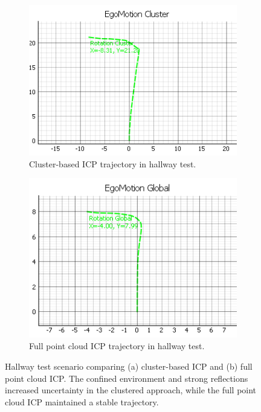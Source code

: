 \begin{figure}[!htbp]
    \centering
    \begin{subfigure}{0.48\linewidth}
        \centering
        \includegraphics[width=\linewidth]{images/hallwayCluster_3.png}
        \caption{Cluster-based ICP trajectory in hallway test.}
        \label{fig:hallway_Clustered}
    \end{subfigure}
    \hfill
    \begin{subfigure}{0.48\linewidth}
        \centering
        \includegraphics[width=\linewidth]{images/hallwayFull_3.png}
        \caption{Full point cloud ICP trajectory in hallway test.}
        \label{fig:hallway_Full}
    \end{subfigure}
    \caption{Hallway test scenario comparing (a) cluster-based ICP and (b) full point cloud ICP.  
    The confined environment and strong reflections increased uncertainty in the clustered approach, while the full point cloud ICP maintained a stable trajectory.}
    \label{fig:hallway_Test}
\end{figure}


